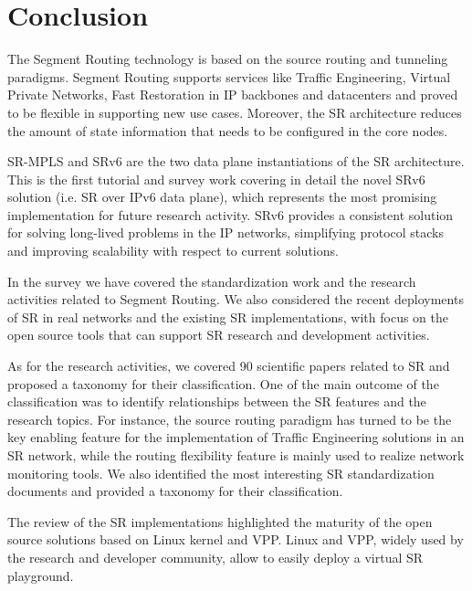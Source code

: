 \section{Conclusion}
\label{sec:conclusion}

The Segment Routing technology is based on the source routing and tunneling paradigms. Segment Routing supports services like Traffic Engineering, Virtual Private Networks, Fast Restoration in IP backbones and datacenters and proved to be flexible in supporting new use cases. Moreover, the SR architecture reduces the amount of state information that needs to be configured in the core nodes. 

SR-MPLS and SRv6 are the two data plane instantiations of the SR architecture. This is the first tutorial and survey work covering in detail the novel SRv6 solution (i.e. SR over IPv6 data plane), which represents the most promising implementation for future research activity. SRv6 provides a consistent solution for solving long-lived problems in the IP networks, simplifying protocol stacks and improving scalability with respect to current solutions.

In the survey we have covered the standardization work and the research activities related to Segment Routing. We also considered the recent deployments of SR in real networks and the existing SR implementations, with focus on the open source tools that can support SR research and development activities.

\begin{comment}
To the best of our knowledge, there is only another survey about Segment Routing, namely \cite{abdullah2018segment}, which focuses on SR-MPLS and only mentions SRv6 architecture and lacks of an analysis of the standardization efforts and implementation results.
\end{comment}

As for the research activities, we covered 90 scientific papers related to SR and proposed a taxonomy for their classification. One of the main outcome of the classification was to identify relationships between the SR features and the research topics. For instance, the source routing paradigm has turned to be the key enabling feature for the implementation of Traffic Engineering solutions in an SR network, while the routing flexibility feature is mainly used to realize network monitoring tools. We also identified the most interesting SR standardization documents and provided a taxonomy for their classification.

The review of the SR implementations highlighted the maturity of the open source solutions based on Linux kernel and VPP. Linux and VPP, widely used by the research and developer community, allow to easily deploy a virtual SR playground. 

